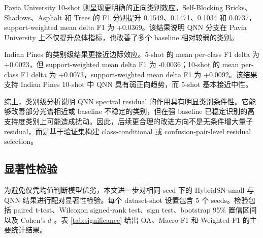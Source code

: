 \documentclass[UTF8,a4paper,zihao=-4,fontset=fandol]{ctexart}
\begin{document}
Pavia University 10-shot 则呈现更明确的正向类别效应。Self-Blocking Bricks、Shadows、Asphalt 和 Trees 的 F1 分别提升 0.1549、0.1471、0.1034 和 0.0737，support-weighted mean delta F1 为 +0.0369。该结果说明 QNN 分支在 Pavia University 上不仅提升总体指标，也改善了多个 baseline 相对较弱的类别。

Indian Pines 的类别级结果更接近边际效应。5-shot 的 mean per-class F1 delta 为 +0.0023，但 support-weighted mean delta F1 为 -0.0036；10-shot 的 mean per-class F1 delta 为 +0.0073，support-weighted mean delta F1 为 +0.0092。该结果支持 Indian Pines 10-shot 中 QNN 具有弱正向趋势，而 5-shot 基本接近中性。

综上，类别级分析说明 QNN spectral residual 的作用具有明显类别条件性。它能够改善部分光谱相近或 baseline 不稳定的类别，但在强 baseline 已稳定识别的高支持度类别上可能造成扰动。因此，后续更合理的改进方向不是无条件增大量子 residual，而是基于验证集构建 class-conditional 或 confusion-pair-level residual selection。

\subsection{显著性检验}

为避免仅凭均值判断模型优劣，本文进一步对相同 seed 下的 HybridSN-small 与 QNN 结果进行配对显著性检验。每个 dataset-shot 设置包含 5 个 seeds。检验包括 paired t-test、Wilcoxon signed-rank test、sign test、bootstrap 95\% 置信区间以及 Cohen's $d_z$。表 \ref{tab:significance} 给出 OA、Macro-F1 和 Weighted-F1 的主要统计结果。
\end{document}
